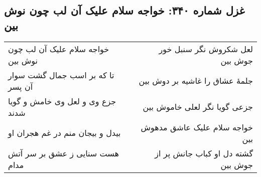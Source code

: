 \begin{center}
\section*{غزل شماره ۳۴۰: خواجه سلام علیک آن لب چون نوش بین}
\label{sec:340}
\begin{longtable}{l p{0.5cm} r}
خواجه سلام علیک آن لب چون نوش بین
&&
لعل شکروش نگر سنبل خور جوش بین
\\
تا که بر اسب جمال گشت سوار آن پسر
&&
جلمهٔ عشاق را غاشیه بر دوش بین
\\
جزع وی و لعل وی خامش و گویا شدند
&&
جزعی گویا نگر لعلی خاموش بین
\\
بیدل و بیجان منم در غم هجران او
&&
خواجه سلام علیک عاشق مدهوش بین
\\
هست سنایی ز عشق بر سر آتش مدام
&&
گشته دل او کباب جانش پر از جوش بین
\\
\end{longtable}
\end{center}
